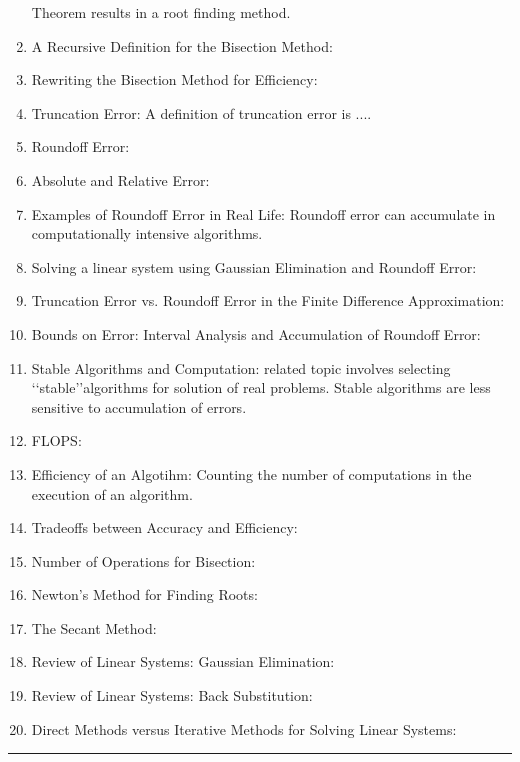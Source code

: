 \documentclass[10pt,fleqn]{article}
\begin{document}
\begin{enumerate}
        Theorem results in a root finding method.
  \item A Recursive Definition for the Bisection Method:
  \item Rewriting the Bisection Method for Efficiency:
  \item Truncation Error: A definition of truncation error is ....
  \item Roundoff Error:
  \item Absolute and Relative Error:
  \item Examples of Roundoff Error in Real Life: Roundoff error can accumulate
        in computationally intensive algorithms.
  \item Solving a linear system using Gaussian Elimination and Roundoff Error:
  \item Truncation Error vs. Roundoff Error in the Finite Difference
        Approximation:
  \item Bounds on Error: Interval Analysis and Accumulation of Roundoff Error:
  \item Stable Algorithms and Computation: related topic involves selecting
       \lq\lq stable\rq\rq algorithms for solution of real problems. Stable
        algorithms are less sensitive to accumulation of errors.
  \item FLOPS:
  \item Efficiency of an Algotihm: Counting the number of computations in the
        execution of an algorithm.
  \item Tradeoffs between Accuracy and Efficiency:
  \item Number of Operations for Bisection:
  \item Newton's Method for Finding Roots:
  \item The Secant Method:
  \item Review of Linear Systems: Gaussian Elimination:
  \item Review of Linear Systems: Back Substitution:
  \item Direct Methods versus Iterative Methods for Solving Linear Systems:
\end{enumerate}
\vskip0.1in\hrule\vskip0.1in
\end{document}
